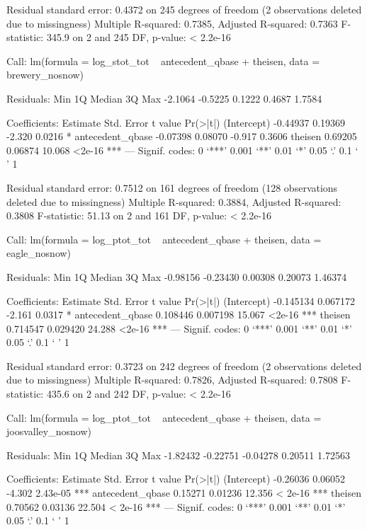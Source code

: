 \documentclass[12pt]{article}
\begin{document}
\begin{Schunk}
\begin{Soutput}
Residual standard error: 0.4372 on 245 degrees of freedom
  (2 observations deleted due to missingness)
Multiple R-squared: 0.7385,	Adjusted R-squared: 0.7363 
F-statistic: 345.9 on 2 and 245 DF,  p-value: < 2.2e-16 
\end{Soutput}
\begin{Soutput}
Call:
lm(formula = log_stot_tot ~ antecedent_qbase + theisen, data = brewery_nosnow)

Residuals:
    Min      1Q  Median      3Q     Max 
-2.1064 -0.5225  0.1222  0.4687  1.7584 

Coefficients:
                 Estimate Std. Error t value Pr(>|t|)    
(Intercept)      -0.44937    0.19369  -2.320   0.0216 *  
antecedent_qbase -0.07398    0.08070  -0.917   0.3606    
theisen           0.69205    0.06874  10.068   <2e-16 ***
---
Signif. codes:  0 ‘***’ 0.001 ‘**’ 0.01 ‘*’ 0.05 ‘.’ 0.1 ‘ ’ 1 

Residual standard error: 0.7512 on 161 degrees of freedom
  (128 observations deleted due to missingness)
Multiple R-squared: 0.3884,	Adjusted R-squared: 0.3808 
F-statistic: 51.13 on 2 and 161 DF,  p-value: < 2.2e-16 
\end{Soutput}
\begin{Soutput}
Call:
lm(formula = log_ptot_tot ~ antecedent_qbase + theisen, data = eagle_nosnow)

Residuals:
     Min       1Q   Median       3Q      Max 
-0.98156 -0.23430  0.00308  0.20073  1.46374 

Coefficients:
                  Estimate Std. Error t value Pr(>|t|)    
(Intercept)      -0.145134   0.067172  -2.161   0.0317 *  
antecedent_qbase  0.108446   0.007198  15.067   <2e-16 ***
theisen           0.714547   0.029420  24.288   <2e-16 ***
---
Signif. codes:  0 ‘***’ 0.001 ‘**’ 0.01 ‘*’ 0.05 ‘.’ 0.1 ‘ ’ 1 

Residual standard error: 0.3723 on 242 degrees of freedom
  (2 observations deleted due to missingness)
Multiple R-squared: 0.7826,	Adjusted R-squared: 0.7808 
F-statistic: 435.6 on 2 and 242 DF,  p-value: < 2.2e-16 
\end{Soutput}
\begin{Soutput}
Call:
lm(formula = log_ptot_tot ~ antecedent_qbase + theisen, data = joosvalley_nosnow)

Residuals:
     Min       1Q   Median       3Q      Max 
-1.82432 -0.22751 -0.04278  0.20511  1.72563 

Coefficients:
                 Estimate Std. Error t value Pr(>|t|)    
(Intercept)      -0.26036    0.06052  -4.302 2.43e-05 ***
antecedent_qbase  0.15271    0.01236  12.356  < 2e-16 ***
theisen           0.70562    0.03136  22.504  < 2e-16 ***
---
Signif. codes:  0 ‘***’ 0.001 ‘**’ 0.01 ‘*’ 0.05 ‘.’ 0.1 ‘ ’ 1 


\end{Soutput}
\end{Schunk}
\end{document}
